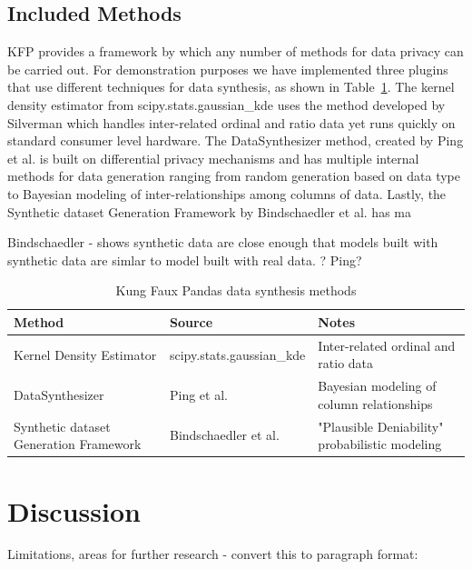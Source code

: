\documentclass{article}
\begin{document}
\subsection{Included Methods}

KFP provides a framework by which any number of methods for data privacy can be carried out. For demonstration purposes we have implemented three plugins that use different techniques for data synthesis, as shown in Table~\ref{included-methods}. The kernel density estimator from scipy.stats.gaussian\_kde uses the method developed by Silverman \cite{silverman_density_1986} which handles inter-related ordinal and ratio data yet runs quickly on standard consumer level hardware. The DataSynthesizer method, created by Ping et al. \cite{ping17datasynthesizer} is built on differential privacy mechanisms and has multiple internal methods for data generation ranging from random generation based on data type to Bayesian modeling of inter-relationships among columns of data. Lastly, the Synthetic dataset Generation Framework by Bindschaedler et al. \cite{Bindschaedler2017} has ma

Bindschaedler - shows synthetic data are close enough that models built with synthetic data are simlar to model built with real data.
? Ping?

\begin{table}
  \caption{Kung Faux Pandas data synthesis methods}
  \label{included-methods}
  \centering
  \begin{tabular}{p{12em} l p{14em}}
    \toprule
    Method                                 & Source                    & Notes \\
    \midrule
    Kernel Density Estimator               & scipy.stats.gaussian\_kde & Inter-related ordinal and ratio data\\
    DataSynthesizer                        & Ping et al.               & Bayesian modeling of column relationships\\
    Synthetic dataset Generation Framework & Bindschaedler et al.      & "Plausible Deniability" probabilistic modeling\\
    \bottomrule
  \end{tabular}
\end{table}

\section{Discussion}

Limitations, areas for further research - convert this to paragraph format:
\end{document}

